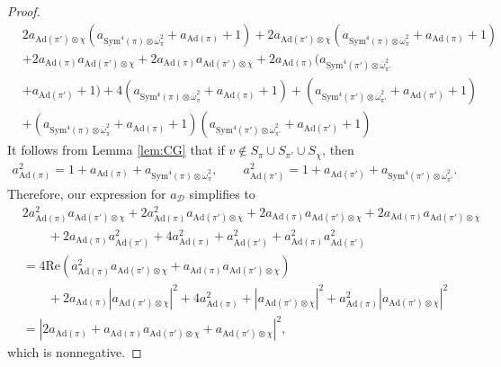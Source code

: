 \documentclass[11pt]{amsart}
\theoremstyle{remark}
\numberwithin{equation}{section}
\begin{document}
\begin{proof}
\begin{align*}
&2 a_{\mathrm{Ad}(\pi')\otimes\chi} (a_{\mathrm{Sym}^4(\pi)\otimes\overline{\omega}_{\pi}^2}+a_{\mathrm{Ad}(\pi)}+1)+2 a_{\mathrm{Ad}(\pi')\otimes\overline{\chi}} (a_{\mathrm{Sym}^4(\pi)\otimes\overline{\omega}_{\pi}^2}+a_{\mathrm{Ad}(\pi)}+1)\\
&+2 a_{\mathrm{Ad}(\pi)} a_{\mathrm{Ad}(\pi')\otimes\chi}+2 a_{\mathrm{Ad}(\pi)} a_{\mathrm{Ad}(\pi')\otimes\overline{\chi}}+2 a_{\mathrm{Ad}(\pi)} (a_{\mathrm{Sym}^4(\pi')\otimes\overline{\omega}_{\pi'}^2}\\
&+a_{\mathrm{Ad}(\pi')}+1)+4 (a_{\mathrm{Sym}^4(\pi)\otimes\overline{\omega}_{\pi}^2}+a_{\mathrm{Ad}(\pi)}+1)+(a_{\mathrm{Sym}^4(\pi')\otimes\overline{\omega}_{\pi'}^2}+a_{\mathrm{Ad}(\pi')}+1)\\
&+(a_{\mathrm{Sym}^4(\pi)\otimes\overline{\omega}_{\pi}^2}+a_{\mathrm{Ad}(\pi)}+1)(a_{\mathrm{Sym}^4(\pi')\otimes\overline{\omega}_{\pi'}^2}+a_{\mathrm{Ad}(\pi')}+1)
\end{align*}
It follows from Lemma \ref{lem:CG} that if $v\notin S_{\pi}\cup S_{\pi'}\cup S_{\chi}$, then
\begin{align*}
a_{\mathrm{Ad}(\pi)}^2=1+a_{\mathrm{Ad}(\pi)}+a_{\mathrm{Sym}^4(\pi)\otimes\overline{\omega}_{\pi}^2},\qquad a_{\mathrm{Ad}(\pi')}^2=1+a_{\mathrm{Ad}(\pi')}+a_{\mathrm{Sym}^4(\pi')\otimes\overline{\omega}_{\pi'}^2}.
\end{align*}
Therefore, our expression for $a_{\mathcal{D}}$ simplifies to
\begin{align*}
&2a_{\mathrm{Ad}(\pi)}^2 a_{\mathrm{Ad}(\pi')\otimes\chi}+2a_{\mathrm{Ad}(\pi)}^2 a_{\mathrm{Ad}(\pi')\otimes\overline{\chi}}+2a_{\mathrm{Ad}(\pi)}a_{\mathrm{Ad}(\pi')\otimes\chi}+2a_{\mathrm{Ad}(\pi)}a_{\mathrm{Ad}(\pi')\otimes\overline{\chi}}\\
&\qquad +2 a_{\mathrm{Ad}(\pi)} a_{\mathrm{Ad}(\pi')}^2+4 a_{\mathrm{Ad}(\pi)}^2+a_{\mathrm{Ad}(\pi')}^2+a_{\mathrm{Ad}(\pi)}^2 a_{\mathrm{Ad}(\pi')}^2\\
&=4 \mathrm{Re}(a_{\text{Ad}(\pi)}^2 a_{\text{Ad}(\pi')\otimes\chi}+a_{\text{Ad}(\pi)} a_{\text{Ad}(\pi')\otimes\chi})\\
&\qquad+2 a_{\text{Ad}(\pi)} |a_{\text{Ad}(\pi')\otimes\chi}|^2+4 a_{\text{Ad}(\pi)}^2+|a_{\text{Ad}(\pi')\otimes\chi}|^2+a_{\text{Ad}(\pi)}^2 |a_{\text{Ad}(\pi')\otimes\chi}|^2\\
&=|2a_{\mathrm{Ad}(\pi)}+a_{\mathrm{Ad}(\pi)}a_{\mathrm{Ad}(\pi')\otimes\chi}+a_{\mathrm{Ad}(\pi')\otimes\chi}|^2,
\end{align*}
which is nonnegative.
\end{proof}
\end{document}
